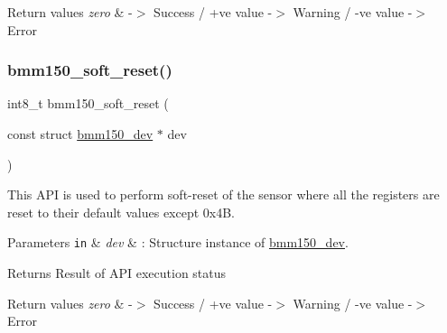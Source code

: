 \begin{DoxyRetVals}{Return values}
{\em zero} & -\/$>$ Success / +ve value -\/$>$ Warning / -\/ve value -\/$>$ Error \\
\hline
\end{DoxyRetVals}
\mbox{\label{group___b_m_m150_gad53c0f1cab22067aaff73d0f172a9dbe}} 
\subsubsection{\texorpdfstring{bmm150\+\_\+soft\+\_\+reset()}{bmm150\_soft\_reset()}}
{\footnotesize\ttfamily int8\+\_\+t bmm150\+\_\+soft\+\_\+reset (\begin{DoxyParamCaption}\item[{const struct \hyperlink{structbmm150__dev}{bmm150\+\_\+dev} $\ast$}]{dev }\end{DoxyParamCaption})}



This A\+PI is used to perform soft-\/reset of the sensor where all the registers are reset to their default values except 0x4B. 


\begin{DoxyParams}[1]{Parameters}
\mbox{\tt in}  & {\em dev} & \+: Structure instance of \hyperlink{structbmm150__dev}{bmm150\+\_\+dev}.\\
\hline
\end{DoxyParams}
\begin{DoxyReturn}{Returns}
Result of A\+PI execution status 
\end{DoxyReturn}

\begin{DoxyRetVals}{Return values}
{\em zero} & -\/$>$ Success / +ve value -\/$>$ Warning / -\/ve value -\/$>$ Error \\
\hline
\end{DoxyRetVals}
